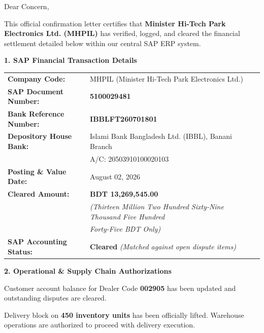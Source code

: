\documentclass[11pt, a4paper]{article}
\begin{document}
\vspace{6pt}

\textcolor{darktext}{Dear Concern,}

\textcolor{darktext}{This official confirmation letter certifies that \textbf{Minister Hi-Tech Park Electronics Ltd. (MHPIL)} has verified, logged, and cleared the financial settlement detailed below within our central SAP ERP system.}

\vspace{8pt}

{\large \bfseries \color{navyblue} 1. SAP Financial Transaction Details}
\vspace{4pt}

\begin{tcolorbox}[colback=lightbg, colframe=navyblue, arc=3pt, boxrule=0.8pt, left=10pt, right=10pt, top=8pt, bottom=8pt]
\renewcommand{\arraystretch}{1.35}
\small
\begin{tabularx}{\textwidth}{@{} >{\bfseries\color{navyblue}}l X @{}}
Company Code: & MHPIL (Minister Hi-Tech Park Electronics Ltd.) \\
SAP Document Number: & \textbf{5100029481} \\
Bank Reference Number: & \textbf{IBBLFT260701801} \\
Depository House Bank: & Islami Bank Bangladesh Ltd. (IBBL), Banani Branch \\
& A/C: 20503910100020103 \\
Posting \& Value Date: & August 02, 2026 \\
Cleared Amount: & \textbf{\color{navyblue} BDT 13,269,545.00} \\
& \textit{(Thirteen Million Two Hundred Sixty-Nine Thousand Five Hundred} \\
& \textit{Forty-Five BDT Only)} \\
SAP Accounting Status: & \textbf{\color{statusgreen} Cleared} \textit{(Matched against open dispute items)} \\
\end{tabularx}
\end{tcolorbox}

\vspace{8pt}

{\large \bfseries \color{navyblue} 2. Operational \& Supply Chain Authorizations}
\vspace{4pt}

\begin{tcolorbox}[colback=white, colframe=bordergray, arc=3pt, boxrule=0.5pt, left=10pt, right=10pt, top=8pt, bottom=8pt]
\small
\begin{description}[leftmargin=0pt, style=unboxed, itemsep=8pt]
    \item[\bfseries Financial Accounting (FI-AR):] Customer account balance for Dealer Code \textbf{002905} has been updated and outstanding disputes are cleared.
    \item[\bfseries Sales \& Distribution (SD):] Delivery block on \textbf{450 inventory units} has been officially lifted. Warehouse operations are authorized to proceed with delivery execution.
\end{description}
\end{tcolorbox}
\end{document}
